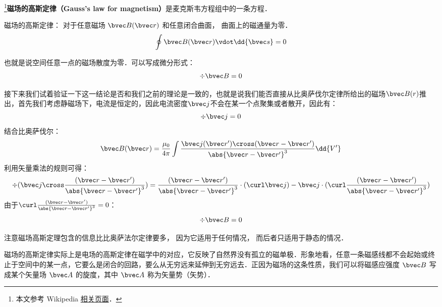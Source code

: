 
\begin{issues}
\issueDraft
\end{issues}


\footnote{本文参考 Wikipedia \href{https://en.wikipedia.org/wiki/Gauss's_law_for_magnetism}{相关页面}．}\textbf{磁场的高斯定律（Gauss's law for magnetism）}是麦克斯韦方程组中的一条方程．

磁场的高斯定律： 对于任意磁场 $\bvec B(\bvec r)$ 和任意闭合曲面， 曲面上的磁通量为零．
\begin{equation}
\oint \bvec B(\bvec r) \vdot \dd{\bvec s} = 0
\end{equation}

也就是说空间任意一点的磁场散度为零．可以写成微分形式：
\begin{equation}
\div\bvec B = 0
\end{equation}

接下来我们试着验证一下这一结论是否和我们之前的理论是一致的，也就是说我们能否直接从比奥萨伐尔定律所给出的磁场$\bvec B(r)$推出，首先我们考虑静磁场下，电流是恒定的，因此电流密度$\bvec j$不会在某一个点聚集或者散开，因此有：
\begin{equation}
\div \bvec j = 0  
\end{equation}
结合比奥萨伐尔：
\begin{equation}
\bvec B(\bvec r) = \frac{\mu_0}{4\pi} \int \frac{\bvec j(\bvec r') \cross (\bvec r - \bvec r')}{\abs{\bvec r - \bvec r'}^3} \dd{V'}
\end{equation}
利用矢量乘法的规则可得：
\begin{equation}
\div(\bvec j \cross \frac{(\bvec r - \bvec r')}{\abs{\bvec r - \bvec r'}^3})=\frac{(\bvec r - \bvec r')}{\abs{\bvec r - \bvec r'}^3}\cdot(\curl \bvec j)-\bvec j\cdot(\curl \frac{(\bvec r - \bvec r')}{\abs{\bvec r - \bvec r'}^3})
\end{equation}
由于$\curl \frac{(\bvec r - \bvec r')}{\abs{\bvec r - \bvec r'}^3} = 0$：
\begin{equation}
\div \bvec B = 0  
\end{equation}

注意磁场高斯定理包含的信息比比奥萨法尔定律要多， 因为它适用于任何情况， 而后者只适用于静态的情况．

磁场的高斯定律实际上是电场的高斯定律在磁学中的对应，它反映了自然界没有孤立的磁单极．形象地看，任意一条磁感线都不会起始或终止于空间中的某一点，它要么是闭合的回路，要么从无穷远来延伸到无穷远去．正因为磁场的这条性质，我们可以将磁感应强度 $\bvec B$ 写成某个矢量场 $\bvec A$ 的旋度，其中 $\bvec A$ 称为矢量势（矢势）．